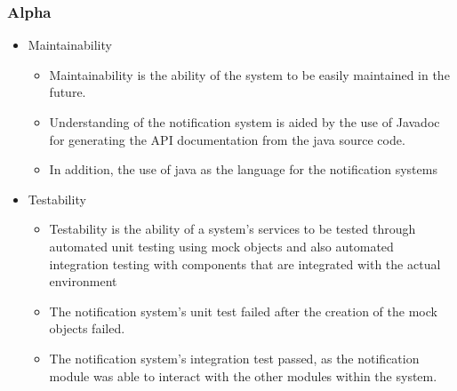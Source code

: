 \subsubsection{Alpha}
\begin{itemize}
	\item Maintainability
		\begin{itemize}
			\item Maintainability is the ability of the system to be easily maintained in the future.
			\item Understanding of the notification system is aided by the use of Javadoc for generating the API documentation from the java source code.
			\item In addition, the use of java as the language for the notification systems 
		\end{itemize}
	\item Testability
		\begin{itemize}
			\item Testability is the ability of a system's services to be tested through automated unit testing using mock objects and also automated integration testing with components that are integrated with the actual environment
			\item The notification system's unit test failed after the creation of the mock objects failed.
			\item The notification system's integration test passed, as the notification module was able to interact with the other modules within the system.
		\end{itemize}
\end{itemize}
